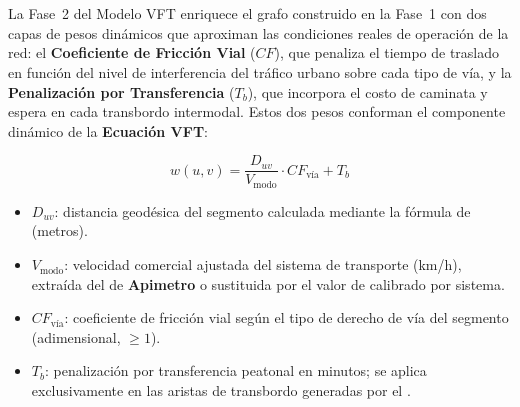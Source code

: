 \section{}
\label{sec:resultados-fase2}


La Fase~2 del Modelo VFT enriquece el grafo construido en la Fase~1 con dos
capas de pesos dinámicos que aproximan las condiciones reales de operación de la
red: el \textbf{Coeficiente de Fricción Vial} ($CF$), que penaliza el tiempo de
traslado en función del nivel de interferencia del tráfico urbano sobre cada
tipo de vía, y la \textbf{Penalización por Transferencia} ($T_b$), que incorpora
el costo de caminata y espera en cada transbordo intermodal. Estos dos pesos
conforman el componente dinámico de la \textbf{Ecuación VFT}:

\begin{equation}
    w(u,v) = \frac{D_{uv}}{V_{\text{modo}}} \cdot CF_{\text{vía}} + T_b
    \label{eq:vft-arista}
\end{equation}

\begin{itemize}
    \item $D_{uv}$: distancia geodésica del segmento calculada mediante la
    fórmula de  (metros).
    \item $V_{\text{modo}}$: velocidad comercial ajustada del sistema de
    transporte (km/h), extraída del \geojson{} de \textbf{Apimetro} o
    sustituida por el valor de  calibrado por sistema.
    \item $CF_{\text{vía}}$: coeficiente de fricción vial según el tipo de
    derecho de vía del segmento (adimensional, $\geq 1$).
    \item $T_b$: penalización por transferencia peatonal en minutos; se aplica
    exclusivamente en las aristas de transbordo generadas por el
    .
\end{itemize}

